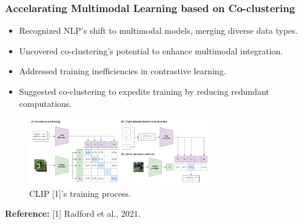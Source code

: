 \documentclass{beamer}
\begin{document}
\begin{frame}
    \frametitle{Accelarating Multimodal Learning based on Co-clustering}
    \begin{itemize}
        \item Recognized NLP's shift to multimodal models, merging diverse data types.
        \item Uncovered co-clustering's potential to enhance multimodal integration.
        \item Addressed training inefficiencies in contrastive learning.
        \item Suggested co-clustering to expedite training by reducing redundant computations.
    \end{itemize}
    \begin{figure}[htbp]
        \centering
        \includegraphics[width=0.7\textwidth]{clip.png}
        \caption{CLIP [1]'s training process.}
        \vspace{-0.5cm}
    \end{figure}
    \textbf{Reference:} [1] Radford et al., 2021.
\end{frame}
\end{document}

